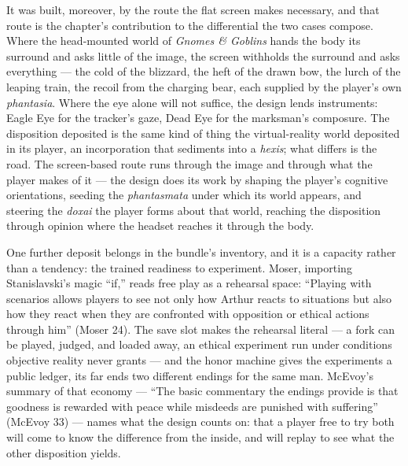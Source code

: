It was built, moreover, by the route the flat screen makes necessary, and that route is the chapter's contribution to the differential the two cases compose. Where the head-mounted world of \textit{Gnomes \& Goblins} hands the body its surround and asks little of the image, the screen withholds the surround and asks everything — the cold of the blizzard, the heft of the drawn bow, the lurch of the leaping train, the recoil from the charging bear, each supplied by the player's own \textit{phantasia}. Where the eye alone will not suffice, the design lends instruments: Eagle Eye for the tracker's gaze, Dead Eye for the marksman's composure. The disposition deposited is the same kind of thing the virtual-reality world deposited in its player, an incorporation that sediments into a \textit{hexis}; what differs is the road. The screen-based route runs through the image and through what the player makes of it — the design does its work by shaping the player's cognitive orientations, seeding the \textit{phantasmata} under which its world appears, and steering the \textit{doxai} the player forms about that world, reaching the disposition through opinion where the headset reaches it through the body.

One further deposit belongs in the bundle's inventory, and it is a capacity rather than a tendency: the trained readiness to experiment. Moser, importing Stanislavski's magic ``if,'' reads free play as a rehearsal space: ``Playing with scenarios allows players to see not only how Arthur reacts to situations but also how they react when they are confronted with opposition or ethical actions through him'' (Moser 24). The save slot makes the rehearsal literal — a fork can be played, judged, and loaded away, an ethical experiment run under conditions objective reality never grants — and the honor machine gives the experiments a public ledger, its far ends two different endings for the same man. McEvoy's summary of that economy — ``The basic commentary the endings provide is that goodness is rewarded with peace while misdeeds are punished with suffering'' (McEvoy 33) — names what the design counts on: that a player free to try both will come to know the difference from the inside, and will replay to see what the other disposition yields.

